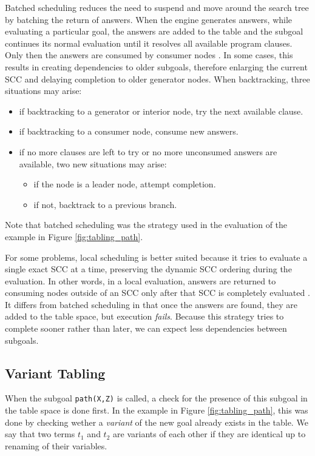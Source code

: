 Batched scheduling reduces the need to suspend and move around the search tree by batching the return of answers.
When the engine generates answers, while evaluating a particular goal, the answers are added to the table and
the subgoal continues its normal evaluation until it resolves all available program clauses. Only then the answers
are consumed by consumer nodes \cite{Freire-96}. In some cases, this results in creating dependencies to older
subgoals, therefore enlarging the current SCC and delaying completion to older generator nodes. When backtracking,
three situations may arise:

\begin{itemize}
  \item if backtracking to a generator or interior node, try the next available clause.
  \item if backtracking to a consumer node, consume new answers.
  \item if no more clauses are left to try or no more unconsumed answers are available, two new situations may arise:
    \begin{itemize}
      \item if the node is a leader node, attempt completion.
      \item if not, backtrack to a previous branch.
    \end{itemize}
\end{itemize}

Note that batched scheduling was the strategy used in the evaluation of the example in Figure \ref{fig:tabling_path}.

For some problems, local scheduling is better suited because it tries to evaluate a single exact SCC at a time, preserving the dynamic
SCC ordering during the evaluation. In other words, in a local evaluation, answers are returned to consuming nodes outside of an SCC only after that
SCC is completely evaluated \cite{Freire-96}.
It differs from batched scheduling in that once the answers are found, they are added to the table space, but execution
\textit{fails}. Because this strategy tries to complete sooner rather than later, we can expect less dependencies between subgoals.

\subsection{Variant Tabling} \label{sec:variant_tabling}

When the subgoal \texttt{path(X,Z)} is called, a check for the presence of this subgoal in the table space is done first.
In the example in Figure \ref{fig:tabling_path}, this was done by checking wether a \textit{variant} of the new goal already
exists in the table. We say that two terms $t_1$ and $t_2$ are variants of each other if they are identical up to renaming of their
variables.


